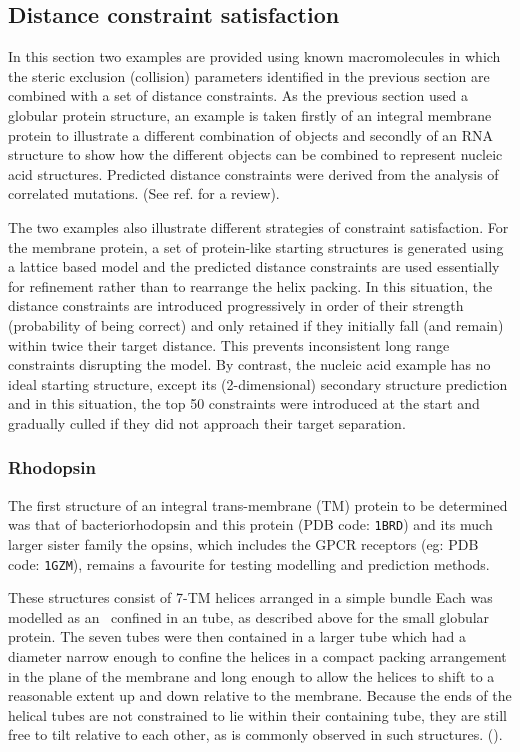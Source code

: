 \subsection{Distance constraint satisfaction}

In this section two examples are provided using known macromolecules in
which the steric exclusion (collision) parameters identified in the previous section are
combined with a set of distance constraints.
As the previous section used a globular protein structure, an example is
taken firstly of an integral membrane protein to illustrate a different 
combination of objects and secondly of an RNA structure to show how the
different objects can be combined to represent nucleic acid structures.
Predicted distance constraints were derived from the analysis of correlated
mutations.  (See ref.\cite{TaylorWRet13} for a review).

The two examples also illustrate different strategies of constraint
satisfaction.   For the membrane protein, a set of protein-like starting 
structures is generated using a lattice based model \cite{TaylorWRet94a} and the
predicted distance constraints are used essentially for refinement rather
than to rearrange the helix packing.  In this situation, the distance
constraints are introduced progressively in order of their strength
(probability of being correct) and only retained if they initially
fall (and remain) within twice their target distance.   This prevents
inconsistent long range constraints disrupting the model.  By contrast,
the nucleic acid example has no ideal starting structure, except its
(2-dimensional) secondary structure prediction and in this situation,
the top 50 constraints were introduced at the start and gradually culled
if they did not approach their target separation.  

\subsubsection{Rhodopsin}

The first structure of an integral trans-membrane (TM) protein to be determined
was that of bacteriorhodopsin and this protein (PDB code: {\tt 1BRD}) and its
much larger sister family the opsins, which includes the GPCR receptors (eg: PDB code:
{\tt 1GZM}), remains a favourite for testing modelling and prediction methods.

These structures consist of 7-TM helices arranged in a simple bundle
Each was modelled as an \AH\ confined in an tube, as described above for the
small globular protein.   The seven tubes were then contained in a larger
tube which had a diameter narrow enough to confine the helices in a compact
packing arrangement in the plane of the membrane and long enough to allow 
the helices to shift to a reasonable extent up and down relative to the membrane.  
Because the ends of the helical tubes are not constrained to lie within their
containing tube, they are still free to tilt relative to each other, as is
commonly observed in such structures.  ().

